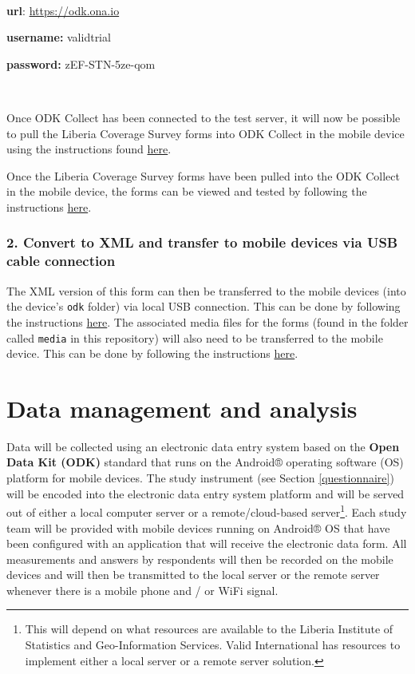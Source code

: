 \documentclass[12pt,a4paper]{book}
\let\rmarkdownfootnote\footnote%
\def\footnote{\protect\rmarkdownfootnote}
\theoremstyle{definition}
\theoremstyle{definition}
\theoremstyle{definition}
\theoremstyle{remark}
\begin{document}
~

\textbf{url}: \url{https://odk.ona.io}

\textbf{username:} validtrial

\textbf{password:} zEF-STN-5ze-qom

~

Once ODK Collect has been connected to the test server, it will now be
possible to pull the Liberia Coverage Survey forms into ODK Collect in
the mobile device using the instructions found
\href{https://docs.opendatakit.org/collect-forms/}{here}.

Once the Liberia Coverage Survey forms have been pulled into the ODK
Collect in the mobile device, the forms can be viewed and tested by
following the instructions
\href{https://docs.opendatakit.org/collect-filling-forms/}{here}.

\hypertarget{convert-to-xml-and-transfer-to-mobile-devices-via-usb-cable-connection}{%
\subsection{2. Convert to XML and transfer to mobile devices via USB
cable
connection}\label{convert-to-xml-and-transfer-to-mobile-devices-via-usb-cable-connection}}

The XML version of this form can then be transferred to the mobile
devices (into the device's \texttt{odk} folder) via local USB
connection. This can be done by following the instructions
\href{https://docs.opendatakit.org/collect-forms/\#loading-forms-directly}{here}.
The associated media files for the forms (found in the folder called
\texttt{media} in this repository) will also need to be transferred to
the mobile device. This can be done by following the instructions
\href{https://docs.opendatakit.org/collect-forms/\#loading-form-media}{here}.

\hypertarget{data}{%
\chapter{Data management and analysis}\label{data}}

Data will be collected using an electronic data entry system based on
the \textbf{Open Data Kit (ODK)} standard that runs on the Android®
operating software (OS) platform for mobile devices. The study
instrument (see Section \ref{questionnaire}) will be encoded into the
electronic data entry system platform and will be served out of either a
local computer server or a remote/cloud-based server\footnote{This will
  depend on what resources are available to the Liberia Institute of
  Statistics and Geo-Information Services. Valid International has
  resources to implement either a local server or a remote server
  solution.}. Each study team will be provided with mobile devices
running on Android® OS that have been configured with an application
that will receive the electronic data form. All measurements and answers
by respondents will then be recorded on the mobile devices and will then
be transmitted to the local server or the remote server whenever there
is a mobile phone and / or WiFi signal.
\end{document}
